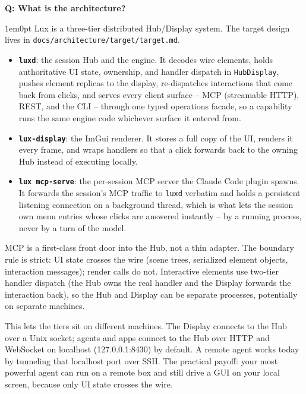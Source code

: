 \documentclass[11pt,letterpaper]{article}
\newcounter{faqnum}
\newenvironment{faqpair}[1]{%
  \needspace{4\baselineskip}%
  \vspace{0.5em}%
  \refstepcounter{faqnum}%
  \noindent\textbf{\color{SectionBlue}Q\thefaqnum: #1}\par\nopagebreak[4]%
  \vspace{0.2em}%
  \begin{adjustwidth}{1em}{0pt}%
  \setlength{\parindent}{0pt}%
}{%
  \end{adjustwidth}%
  \vspace{0.5em}%
}
\begin{document}
\begin{faqpair}{What is the architecture?}\label{faq:architecture}
  Lux is a three-tier distributed Hub/Display system. The target design lives
  in {\small\texttt{docs/architecture/\allowbreak target/\allowbreak target.md}}.

  \begin{itemize}[nosep]
    \item \textbf{\texttt{luxd}}: the session Hub and the engine. It decodes
      wire elements, holds authoritative UI state, ownership, and handler
      dispatch in \texttt{HubDisplay}, pushes element replicas to the display,
      re-dispatches interactions that come back from clicks, and serves every
      client surface -- MCP (streamable HTTP), REST, and the CLI -- through one
      typed operations facade, so a capability runs the same engine code
      whichever surface it entered from.
    \item \textbf{\texttt{lux-display}}: the ImGui renderer. It stores a full
      copy of the UI, renders it every frame, and wraps handlers so that a click
      forwards back to the owning Hub instead of executing locally.
    \item \textbf{\texttt{lux mcp-serve}}: the per-session MCP server the
      Claude Code plugin spawns. It forwards the session's MCP traffic to
      \texttt{luxd} verbatim and holds a persistent listening connection on a
      background thread, which is what lets the session own menu entries whose
      clicks are answered instantly -- by a running process, never by a turn of
      the model.
  \end{itemize}

  MCP is a first-class front door into the Hub, not a thin adapter. The
  boundary rule is strict: UI state crosses the wire (scene
  trees, serialized element objects, interaction messages); render calls do not.
  Interactive elements use two-tier handler dispatch (the Hub owns the real
  handler and the Display forwards the interaction back), so the Hub and
  Display can be separate processes, potentially on separate machines.

  This lets the tiers sit on different machines. The Display connects to
  the Hub over a Unix socket; agents and apps connect to the Hub over HTTP and
  WebSocket on localhost (127.0.0.1:8430) by default. A remote agent works
  today by tunneling that localhost port over SSH. The practical payoff:
  your most powerful agent can run on a remote box and still drive a GUI on your
  local screen, because only UI state crosses the wire.
\end{faqpair}
\end{document}
